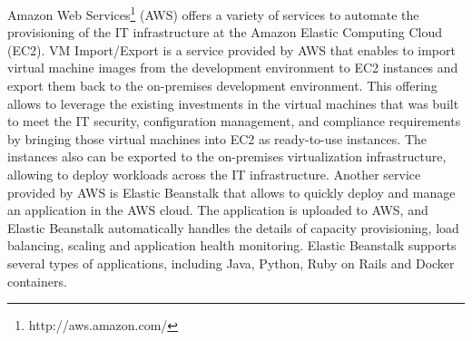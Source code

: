 Amazon Web Services\footnote{http://aws.amazon.com/} (AWS) offers a variety of services to automate
the provisioning of the IT infrastructure at the Amazon Elastic Computing Cloud (EC2). VM Import/Export is a
service provided by AWS that enables to import virtual machine images from the development environment
to EC2 instances and export them back to the on-premises development environment. This offering allows
to leverage the existing investments in the virtual machines that was built to meet the IT security,
configuration management, and compliance requirements by bringing those virtual machines into EC2 as
ready-to-use instances. The instances also can be exported to the on-premises virtualization infrastructure,
allowing to deploy workloads across the IT infrastructure. Another service provided by AWS is Elastic Beanstalk
that allows to quickly deploy and manage an application in the AWS cloud. The application is uploaded to AWS,
and Elastic Beanstalk automatically handles the details of capacity provisioning, load balancing,
scaling and application health monitoring. Elastic Beanstalk supports several types of applications,
including Java, Python, Ruby on Rails and Docker containers.

